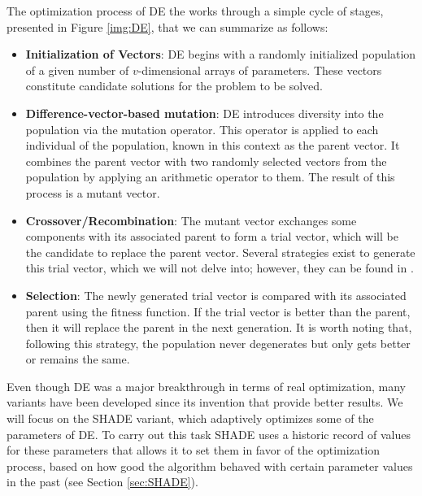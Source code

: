 \documentclass[review]{elsarticle}
\begin{document}
The optimization process of DE the works through a simple cycle of stages, presented in Figure \ref{img:DE}, that we can summarize as follows:

\begin{itemize}
	
	\item \textbf{Initialization of Vectors}: DE begins with a randomly initialized population of a given number of $v$-dimensional arrays of parameters. These vectors constitute candidate solutions for the problem to be solved.
	
	\item \textbf{Difference-vector-based mutation}: DE introduces diversity into the population via the mutation operator. This operator is applied to each individual of the population, known in this context as the parent vector. It combines the parent vector with two randomly selected vectors from the population by applying an arithmetic operator to them. The result of this process is a mutant vector.
	
	\item \textbf{Crossover/Recombination}: The mutant vector exchanges some components with its associated parent to form a trial vector, which will be the candidate to replace the parent vector. Several strategies exist to generate this trial vector, which we will not delve into; however, they can be found in \cite{das2011differential}.
	
	\item \textbf{Selection}: The newly generated trial vector is compared with its associated parent using the fitness function. If the trial vector is better than the parent, then it will replace the parent in the next generation. It is worth noting that, following this strategy, the population never degenerates but only gets better or remains the same.
	
\end{itemize}

Even though DE was a major breakthrough in terms of real optimization, many variants have been developed since its invention that provide better results. We will focus on the SHADE variant, which adaptively optimizes some of the parameters of DE. To carry out this task SHADE uses a historic record of values for these parameters that allows it to set them in favor of the optimization process, based on how good the algorithm behaved with certain parameter values in the past (see Section \ref{sec:SHADE}).
\end{document}
